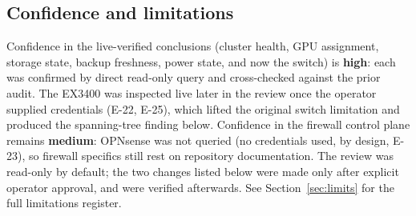 \subsection{Confidence and limitations}

Confidence in the live-verified conclusions (cluster health, GPU assignment,
storage state, backup freshness, power state, and now the switch) is \textbf{high}:
each was confirmed by direct read-only query and cross-checked against the prior
audit. The EX3400 was inspected live later in the review once the operator supplied
credentials (E-22, E-25), which lifted the original switch limitation and produced
the spanning-tree finding below. Confidence in the firewall control plane remains
\textbf{medium}: OPNsense was not queried (no credentials used, by design, E-23), so
firewall specifics still rest on repository documentation. The review was read-only
by default; the two changes listed below were made only after explicit operator
approval, and were verified afterwards. See Section~\ref{sec:limits} for the full
limitations register.
